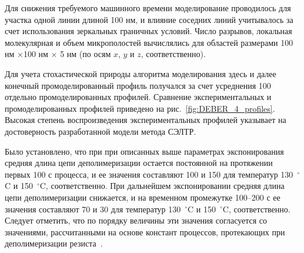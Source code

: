 Для снижения требуемого машинного времени моделирование проводилось для участка одной линии длиной 100 нм, и влияние соседних линий учитывалось за счет использования зеркальных граничных условий. Число разрывов, локальная молекулярная и объем микрополостей вычислялись для областей размерами 100 нм $\times $100 нм $\times$ 5 нм (по осям $x$, $y$ и $z$, соответственно).

Для учета стохастической природы алгоритма моделирования здесь и далее конечный промоделированный профиль получался за счет усреднения 100 отдельно промоделированных профилей. Сравнение экспериментальных и промоделированных профилей приведено на рис.~\ref{fig:DEBER_4_profiles}. Высокая степень воспроизведения экспериментальных профилей указывает на достоверность разработанной модели метода СЭЛТР.

Было установлено, что при при описанных выше параметрах экспонирования средняя длина цепи деполимеризации остается постоянной на протяжении первых 100 с процесса, и ее значения составляют 100 и 150 для температур 130~$^\circ$C и 150~$^\circ$C, соответственно. При дальнейшем экспонировании средняя длина цепи деполимеризации снижается, и на временном промежутке 100--200 с ее значения составляют 70 и 30 для температур 130~$^\circ$C и 150~$^\circ$C, соответственно. Следует отметить, что по порядку величины эти значения согласуется со значениями, рассчитанными на основе констант процессов, протекающих при деполимеризации резиста~\cite{Mita_PMMA_zip_lengths_T}.

